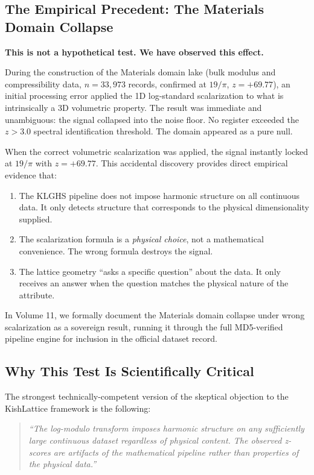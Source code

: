 \documentclass[12pt,a4paper]{article}
\begin{document}
\subsection{The Empirical Precedent: The Materials Domain Collapse}
\label{sec:materials_collapse}

\textbf{This is not a hypothetical test. We have observed this effect.}

During the construction of the Materials domain lake (bulk modulus and
compressibility data, $n = 33{,}973$ records, confirmed at $19/\pi$,
$z = +69.77$), an initial processing error applied the 1D log-standard
scalarization to what is intrinsically a 3D volumetric property. The result was
immediate and unambiguous: the signal collapsed into the noise floor. No register
exceeded the $z > 3.0$ spectral identification threshold. The domain appeared
as a pure null.

When the correct volumetric scalarization was applied, the signal instantly
locked at $19/\pi$ with $z = +69.77$. This accidental discovery provides direct empirical evidence that:
\begin{enumerate}
  \item The KLGHS pipeline does not impose harmonic structure on all continuous
        data. It only detects structure that corresponds to the physical
        dimensionality supplied.
  \item The scalarization formula is a \emph{physical choice}, not a
        mathematical convenience. The wrong formula destroys the signal.
  \item The lattice geometry ``asks a specific question'' about the data. It
        only receives an answer when the question matches the physical nature
        of the attribute.
\end{enumerate}

In Volume 11, we formally document the Materials domain collapse under wrong
scalarization as a sovereign result, running it through the full MD5-verified
pipeline engine for inclusion in the official dataset record.

\subsection{Why This Test Is Scientifically Critical}

The strongest technically-competent version of the skeptical objection to the
KishLattice framework is the following:

\begin{quote}
\textit{``The log-modulo transform imposes harmonic structure on any sufficiently
large continuous dataset regardless of physical content. The observed z-scores
are artifacts of the mathematical pipeline rather than properties of the
physical data.''}
\end{quote}
\end{document}
